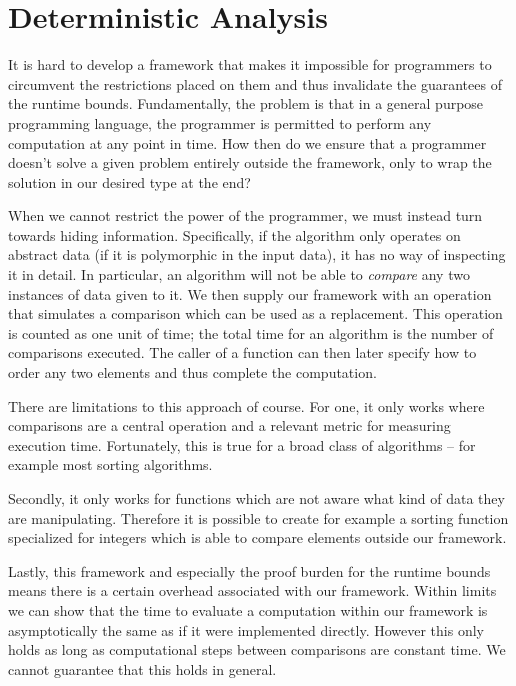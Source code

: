 
\chapter{Deterministic Analysis}
\label{ch:detanalysis}
It is hard to develop a framework that makes it impossible for programmers to circumvent the restrictions placed on them and thus invalidate the guarantees of the runtime bounds. Fundamentally, the problem is that in a general purpose programming language, the programmer is permitted to perform any computation at any point in time. How then do we ensure that a programmer doesn't solve a given problem entirely outside the framework, only to wrap the solution in our desired type at the end?

When we cannot restrict the power of the programmer, we must instead turn towards hiding information. Specifically, if the algorithm only operates on abstract data (if it is polymorphic in the input data), it has no way of inspecting it in detail. In particular, an algorithm will not be able to \emph{compare} any two instances of data given to it. We then supply our framework with an operation that simulates a comparison which can be used as a replacement. This operation is counted as one unit of time; the total time for an algorithm is the number of comparisons executed. The caller of a function can then later specify how to order any two elements and thus complete the computation.

There are limitations to this approach of course. For one, it only works where comparisons are a central operation and a relevant metric for measuring execution time. Fortunately, this is true for a broad class of algorithms -- for example most sorting algorithms.

Secondly, it only works for functions which are not aware what kind of data they are manipulating. Therefore it is possible to create for example a sorting function specialized for integers which is able to compare elements outside our framework.

Lastly, this framework and especially the proof burden for the runtime bounds means there is a certain overhead associated with our framework. Within limits we can show that the time to evaluate a computation within our framework is asymptotically the same as if it were implemented directly. However this only holds as long as computational steps between comparisons are constant time. We cannot guarantee that this holds in general.

